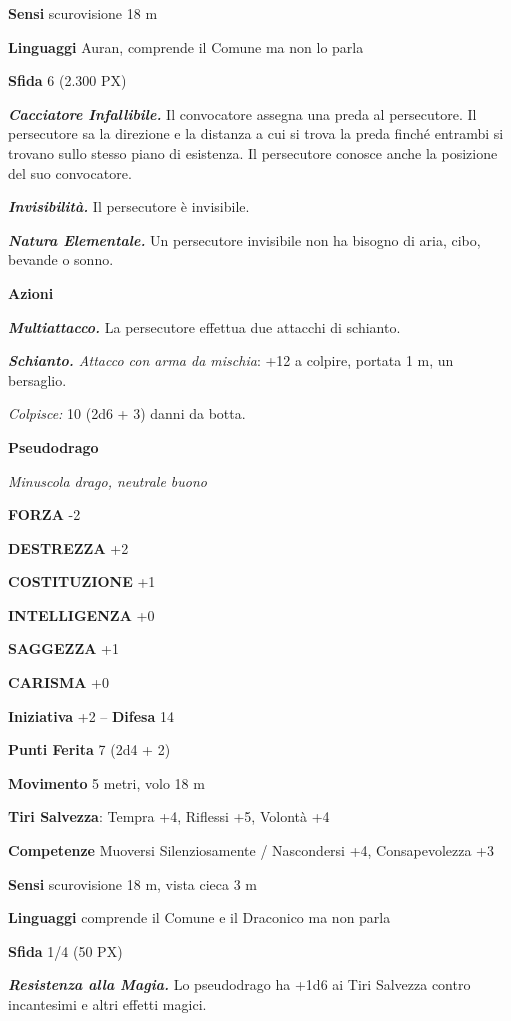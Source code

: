 \begin{multicols}{2}
	\textbf{Sensi} scurovisione 18 m

	\textbf{Linguaggi} Auran, comprende il Comune ma non lo parla

	\textbf{Sfida} 6 (2.300 PX)

	\textit{\textbf{Cacciatore Infallibile.}} Il convocatore assegna una preda al persecutore. Il persecutore sa la direzione e la distanza a cui si trova la preda finché entrambi si trovano sullo stesso piano di esistenza. Il persecutore conosce anche la posizione del suo convocatore.

	\textit{\textbf{Invisibilità.}} Il persecutore è invisibile.

	\textit{\textbf{Natura Elementale.}} Un persecutore invisibile non ha bisogno di aria, cibo, bevande o sonno.

	\textbf{Azioni}

	\textit{\textbf{Multiattacco.}} La persecutore effettua due attacchi di schianto.



	\textit{\textbf{Schianto.} Attacco con arma da mischia}: +12 a colpire, portata 1 m, un bersaglio.

	\textit{Colpisce:} 10 (2d6 + 3) danni da botta.

	\medskip{}\textbf{Pseudodrago}

	\textit{Minuscola drago, neutrale buono}

	\textbf{FORZA} -2

	\textbf{DESTREZZA} +2

	\textbf{COSTITUZIONE} +1

	\textbf{INTELLIGENZA} +0

	\textbf{SAGGEZZA} +1

	\textbf{CARISMA} +0

	\textbf{Iniziativa} +2 -- \textbf{Difesa} 14

	\textbf{Punti Ferita} 7 (2d4 + 2)

	\textbf{Movimento} 5 metri, volo 18 m

	\textbf{Tiri Salvezza}: Tempra +4, Riflessi +5, Volontà +4

	\textbf{Competenze} Muoversi Silenziosamente / Nascondersi +4, Consapevolezza +3

	\textbf{Sensi} scurovisione 18 m, vista cieca 3 m

	\textbf{Linguaggi} comprende il Comune e il Draconico ma non parla

	\textbf{Sfida} 1/4 (50 PX)

	\textit{\textbf{Resistenza alla Magia.}} Lo pseudodrago ha +1d6 ai Tiri Salvezza contro incantesimi e altri effetti magici.


\end{multicols}
